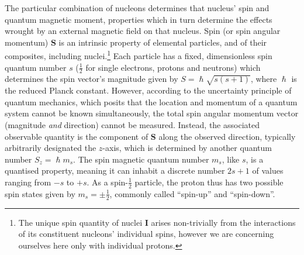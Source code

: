The particular combination of nucleons determines that nucleus' spin and quantum magnetic moment, properties which in turn determine the effects wrought by an external magnetic field on that nucleus.
Spin (or spin angular momentum) $\mathbf{S}$ is an intrinsic property of elemental particles, and of their composites, including nuclei\autocite{Eisberg1961}.\footnote[2]{The unique spin quantity of nuclei $\mathbf{I}$ arises non-trivially from the interactions of its constituent nucleons' individual spins, however we are concerning ourselves here only with individual protons.}
Each particle has a fixed, dimensionless spin quantum number $s$ ($\frac{1}{2}$ for single electrons, protons and neutrons) which determines the spin vector's magnitude given by $S = \hslash \sqrt{s(s+1)}$, where $\hslash$ is the reduced Planck constant.
However, according to the uncertainty principle of quantum mechanics, which posits that the location and momentum of a quantum system cannot be known simultaneously, the total spin angular momentum vector (magnitude \textit{and} direction) cannot be measured.
Instead, the associated observable quantity is the component of $\mathbf{S}$ along the observed direction, typically arbitrarily designated the $z$-axis, which is determined by another quantum number $S_z = \hslash m_s$.
The spin magnetic quantum number $m_s$, like $s$, is a quantised property, meaning it can inhabit a discrete number $2s+1$ of values ranging from $-s$ to $+s$.
As a spin-$\frac{1}{2}$ particle, the proton thus has two possible spin states given by $m_s = \pm \frac{1}{2}$, commonly called ``spin-up'' and ``spin-down''.

